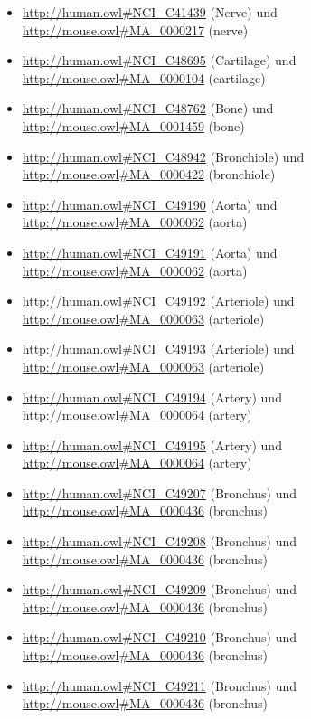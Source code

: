 \begin{itemize}
	\item \url{http://human.owl#NCI_C41439} (Nerve\textunderscoreSheaths) und \url{http://mouse.owl#MA_0000217} (nerve)
	\item \url{http://human.owl#NCI_C48695} (Cartilage\textunderscoreCell) und \url{http://mouse.owl#MA_0000104} (cartilage)
	\item \url{http://human.owl#NCI_C48762} (Bone\textunderscoreCell) und \url{http://mouse.owl#MA_0001459} (bone)
	\item \url{http://human.owl#NCI_C48942} (Bronchiole\textunderscoreEpithelium) und \url{http://mouse.owl#MA_0000422} (bronchiole)
	\item \url{http://human.owl#NCI_C49190} (Aorta\textunderscoreEndothelium) und \url{http://mouse.owl#MA_0000062} (aorta)
	\item \url{http://human.owl#NCI_C49191} (Aorta\textunderscoreSmooth\textunderscoreMuscle\textunderscoreTissue) und \url{http://mouse.owl#MA_0000062} (aorta)
	\item \url{http://human.owl#NCI_C49192} (Arteriole\textunderscoreEndothelium) und \url{http://mouse.owl#MA_0000063} (arteriole)
	\item \url{http://human.owl#NCI_C49193} (Arteriole\textunderscoreSmooth\textunderscoreMuscle\textunderscoreTissue) und \url{http://mouse.owl#MA_0000063} (arteriole)
	\item \url{http://human.owl#NCI_C49194} (Artery\textunderscoreEndothelium) und \url{http://mouse.owl#MA_0000064} (artery)
	\item \url{http://human.owl#NCI_C49195} (Artery\textunderscoreSmooth\textunderscoreMuscle\textunderscoreTissue) und \url{http://mouse.owl#MA_0000064} (artery)
	\item \url{http://human.owl#NCI_C49207} (Bronchus\textunderscoreBasal\textunderscoreLamina) und \url{http://mouse.owl#MA_0000436} (bronchus)
	\item \url{http://human.owl#NCI_C49208} (Bronchus\textunderscoreBasement\textunderscoreMembrane) und \url{http://mouse.owl#MA_0000436} (bronchus)
	\item \url{http://human.owl#NCI_C49209} (Bronchus\textunderscoreCartilage) und \url{http://mouse.owl#MA_0000436} (bronchus)
	\item \url{http://human.owl#NCI_C49210} (Bronchus\textunderscoreConnective\textunderscoreTissue) und \url{http://mouse.owl#MA_0000436} (bronchus)
	\item \url{http://human.owl#NCI_C49211} (Bronchus\textunderscoreElastic\textunderscoreTissue) und \url{http://mouse.owl#MA_0000436} (bronchus)

\end{itemize}
